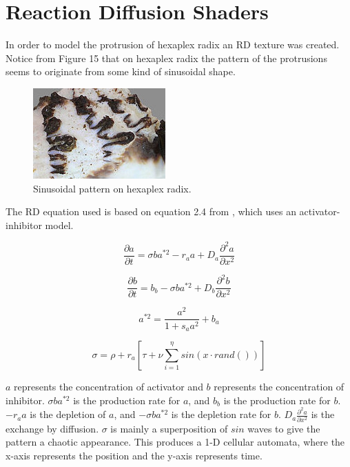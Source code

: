 \documentclass[a4paper]{article}
\begin{document}
\section{Reaction Diffusion Shaders}

In order to model the protrusion of hexaplex radix an RD texture was created. Notice from Figure 15 that on hexaplex radix the pattern of the protrusions seems to originate from some kind of sinusoidal shape.

\begin{figure}[h]
	\centering\includegraphics[scale=1.0]{./img/hexaplex_radix_sine.jpg}
	\caption{Sinusoidal pattern on hexaplex radix.}
	\label{hexaplex-sine} %
\end{figure}

The RD equation used is based on equation 2.4 from \cite{abss}, which uses an activator-inhibitor model.

\begin{equation}
	\frac{\partial a}{\partial t} = \sigma b a^{*2} - r_a a + D_a \frac{\partial^2 a }{\partial x^2}
\end{equation}

\begin{equation}
	\frac{\partial b}{\partial t} = b_b - \sigma b a^{*2} + D_b \frac{\partial^2 b }{\partial x^2}
\end{equation}

\begin{equation*}
	a^{*2} = \frac{a^2}{1+s_a a^2} + b_a
\end{equation*}

\begin{equation*}
\sigma = \rho + r_a  [\tau + \nu \sum_{i=1}^{\eta}{sin(x \cdot rand())}]
\end{equation*}

$a$ represents the concentration of activator and $b$ represents the concentration of inhibitor. $\sigma b a^{*2}$ is the production rate for $a$, and $b_b$ is the production rate for $b$. $-r_a a$ is the depletion of $a$, and $-\sigma b a^{*2}$ is the depletion rate for $b$. $D_a \frac{\partial^2 a }{\partial x^2}$ is the exchange by diffusion. $\sigma$ is mainly a superposition of $sin$ waves to give the pattern a chaotic appearance. This produces a 1-D cellular automata, where the x-axis represents the position and the y-axis represents time.
\end{document}
